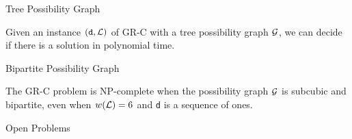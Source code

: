 \begin{frame}{Tree Possibility Graph}
    \begin{proposition}[1]
        Given an instance $(\texttt{d}, \mathcal{L})$ of GR-C with a tree possibility graph $\mathcal{G}$, we can decide if there is a solution in polynomial time.
    \end{proposition}
\end{frame}

\begin{frame}{Bipartite Possibility Graph}
    \begin{theorem}[4]
        The GR-C problem is NP-complete when the possibility graph $\mathcal{G}$ is subcubic and bipartite, even when $w(\mathcal{L}) = 6$ and \texttt{d} is a sequence of ones.
    \end{theorem}
\end{frame}

\begin{frame}{Open Problems}
    \centering
    \Large

\end{frame}